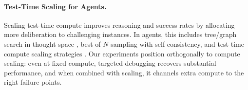 \paragraph{Test-Time Scaling for Agents.}
Scaling test-time compute improves reasoning and success rates by allocating more deliberation to challenging instances. In agents, this includes tree/graph search in thought space \citep{yao2023treeofthoughts,besta2023graphofthoughts}, best-of-$N$ sampling with self-consistency, and test-time compute scaling strategies \cite{li2025metal}. Our experiments position \ModelName{} orthogonally to compute scaling: even at fixed compute, targeted debugging recovers substantial performance, and when combined with scaling, it channels extra compute to the right failure points.

\vspace{-0.1in}
